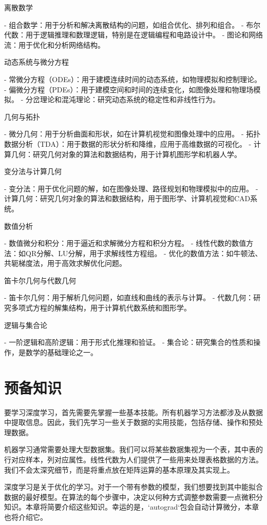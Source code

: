 离散数学

- 组合数学：用于分析和解决离散结构的问题，如组合优化、排列和组合。
- 布尔代数：用于逻辑推理和数理逻辑，特别是在逻辑编程和电路设计中。
- 图论和网络流：用于优化和分析网络结构。

动态系统与微分方程

- 常微分方程（ODEs）：用于建模连续时间的动态系统，如物理模拟和控制理论。
- 偏微分方程（PDEs）：用于建模空间和时间的连续变化，如图像处理和物理场模拟。
- 分岔理论和混沌理论：研究动态系统的稳定性和非线性行为。

几何与拓扑

- 微分几何：用于分析曲面和形状，如在计算机视觉和图像处理中的应用。
- 拓扑数据分析（TDA）：用于数据的形状分析和降维，应用于高维数据的可视化。
- 计算几何：研究几何对象的算法和数据结构，用于计算机图形学和机器人学。

变分法与计算几何

- 变分法：用于优化问题的解，如在图像处理、路径规划和物理模拟中的应用。
- 计算几何：研究几何对象的算法和数据结构，用于图形学、计算机视觉和CAD系统。

数值分析

- 数值微分和积分：用于逼近和求解微分方程和积分方程。
- 线性代数的数值方法：如QR分解、LU分解，用于求解线性方程组。
- 优化的数值方法：如牛顿法、共轭梯度法，用于高效求解优化问题。

笛卡尔几何与代数几何

- 笛卡尔几何：用于解析几何问题，如直线和曲线的表示与计算。
- 代数几何：研究多项式方程的解集结构，用于计算机代数系统和图形学。

逻辑与集合论

- 一阶逻辑和高阶逻辑：用于形式化推理和验证。
- 集合论：研究集合的性质和操作，是数学的基础理论之一。

\section{预备知识}

要学习深度学习，首先需要先掌握一些基本技能。所有机器学习方法都涉及从数据中提取信息。因此，我们先学习一些关于数据的实用技能，包括存储、操作和预处理数据。

机器学习通常需要处理大型数据集。我们可以将某些数据集视为一个表，其中表的行对应样本，列对应属性。线性代数为人们提供了一些用来处理表格数据的方法。我们不会太深究细节，而是将重点放在矩阵运算的基本原理及其实现上。

深度学习是关于优化的学习。对于一个带有参数的模型，我们想要找到其中能拟合数据的最好模型。在算法的每个步骤中，决定以何种方式调整参数需要一点微积分知识。本章将简要介绍这些知识。幸运的是，`autograd`包会自动计算微分，本章也将介绍它。

